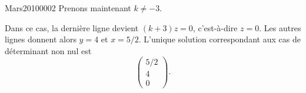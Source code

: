 \begin{corrige}{Mars20100002}
	Prenons maintenant $k\neq -3$.

	Dans ce cas, la dernière ligne devient $(k+3)z=0$, c'est-à-dire $z=0$. Les autres lignes donnent alors $y=4$ et $x=5/2$. L'unique solution correspondant aux cas de déterminant non nul est
	\begin{equation}
		\begin{pmatrix}
			5/2	\\ 
			4	\\ 
			0	
		\end{pmatrix}.
	\end{equation}

\end{corrige}
